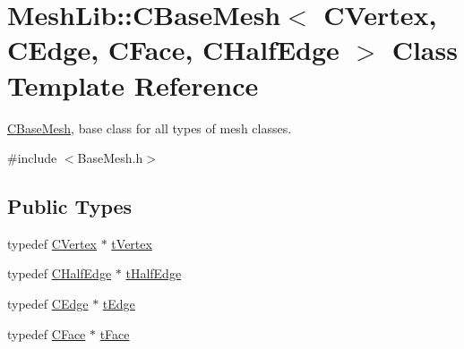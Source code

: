 \hypertarget{class_mesh_lib_1_1_c_base_mesh}{}\section{Mesh\+Lib\+:\+:C\+Base\+Mesh$<$ C\+Vertex, C\+Edge, C\+Face, C\+Half\+Edge $>$ Class Template Reference}
\label{class_mesh_lib_1_1_c_base_mesh}


\hyperlink{class_mesh_lib_1_1_c_base_mesh}{C\+Base\+Mesh}, base class for all types of mesh classes.  




{\ttfamily \#include $<$Base\+Mesh.\+h$>$}

\subsection*{Public Types}
\begin{DoxyCompactItemize}
\item 
typedef \hyperlink{class_mesh_lib_1_1_c_vertex}{C\+Vertex} $\ast$ \hyperlink{class_mesh_lib_1_1_c_base_mesh_adcf412e8267910b50f3145d6416947da}{t\+Vertex}
\item 
typedef \hyperlink{class_mesh_lib_1_1_c_half_edge}{C\+Half\+Edge} $\ast$ \hyperlink{class_mesh_lib_1_1_c_base_mesh_a30024aa977abb5ab248e7c87ba1ec109}{t\+Half\+Edge}
\item 
typedef \hyperlink{class_mesh_lib_1_1_c_edge}{C\+Edge} $\ast$ \hyperlink{class_mesh_lib_1_1_c_base_mesh_a966f6321c2cf92b849e77b931a36821b}{t\+Edge}
\item 
typedef \hyperlink{class_mesh_lib_1_1_c_face}{C\+Face} $\ast$ \hyperlink{class_mesh_lib_1_1_c_base_mesh_ad231546551e85dffb41c9aa9bcf5b86b}{t\+Face}
\end{DoxyCompactItemize}
